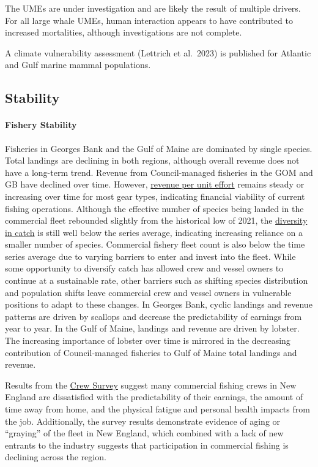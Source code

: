 \documentclass[
  10pt,
]{article}
\begin{document}
The UMEs are under investigation and are likely the result of multiple drivers. For all large whale UMEs, human interaction appears to have contributed to increased mortalities, although investigations are not complete.

A climate vulnerability assessment (Lettrich et al.~2023) is published for Atlantic and Gulf marine mammal populations.

\newpage

\subsection{Stability}\label{stability}

\paragraph{Fishery Stability}\label{fishery-stability}

Fisheries in Georges Bank and the Gulf of Maine are dominated by single species. Total landings are declining in both regions, although overall revenue does not have a long-term trend. Revenue from Council-managed fisheries in the GOM and GB have declined over time. However, \href{https://noaa-edab.github.io/catalog/effective_sweptarea.html}{revenue per unit effort} remains steady or increasing over time for most gear types, indicating financial viability of current fishing operations. Although the effective number of species being landed in the commercial fleet rebounded slightly from the historical low of 2021, the \href{https://noaa-edab.github.io/catalog/recdat.html}{diversity in catch} is still well below the series average, indicating increasing reliance on a smaller number of species. Commercial fishery fleet count is also below the time series average due to varying barriers to enter and invest into the fleet. While some opportunity to diversify catch has allowed crew and vessel owners to continue at a sustainable rate, other barriers such as shifting species distribution and population shifts leave commercial crew and vessel owners in vulnerable positions to adapt to these changes. In Georges Bank, cyclic landings and revenue patterns are driven by scallops and decrease the predictability of earnings from year to year. In the Gulf of Maine, landings and revenue are driven by lobster. The increasing importance of lobster over time is mirrored in the decreasing contribution of Council-managed fisheries to Gulf of Maine total landings and revenue.

Results from the \href{https://noaa-edab.github.io/catalog/crew_survey.html}{Crew Survey} suggest many commercial fishing crews in New England are dissatisfied with the predictability of their earnings, the amount of time away from home, and the physical fatigue and personal health impacts from the job. Additionally, the survey results demonstrate evidence of aging or ``graying'' of the fleet in New England, which combined with a lack of new entrants to the industry suggests that participation in commercial fishing is declining across the region.
\end{document}
